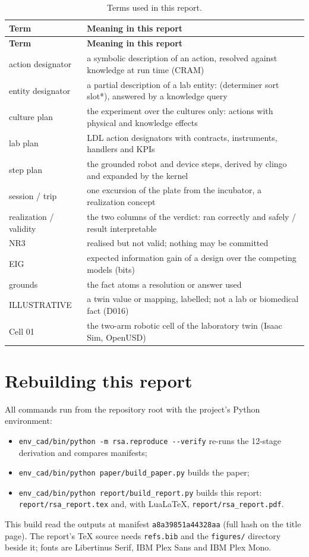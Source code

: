 \documentclass[10pt,a4paper]{article}
\begin{document}
{\small
\begin{xltabular}{\linewidth}{p{3.4cm}X}
\caption{Terms used in this report.}\label{tab:glossary}\\
\toprule
\textbf{Term} & \textbf{Meaning in this report} \\\midrule
\endfirsthead
\toprule
\textbf{Term} & \textbf{Meaning in this report} \\\midrule
\endhead
\bottomrule
\endlastfoot
action designator & a symbolic description of an action, resolved against knowledge at run time (CRAM) \\
entity designator & a partial description of a lab entity: (determiner sort slot*), answered by a knowledge query \\
culture plan & the experiment over the cultures only: actions with physical and knowledge effects \\
lab plan & LDL action designators with contracts, instruments, handlers and KPIs \\
step plan & the grounded robot and device steps, derived by clingo and expanded by the kernel \\
session / trip & one excursion of the plate from the incubator, a realization concept \\
realization / validity & the two columns of the verdict: ran correctly and safely / result interpretable \\
NR3 & realised but not valid; nothing may be committed \\
EIG & expected information gain of a design over the competing models (bits) \\
grounds & the fact atoms a resolution or answer used \\
ILLUSTRATIVE & a twin value or mapping, labelled; not a lab or biomedical fact (D016) \\
Cell 01 & the two-arm robotic cell of the laboratory twin (Isaac Sim, OpenUSD) \\
\end{xltabular}}

\section{Rebuilding this report}\label{sec:rebuild}

All commands run from the repository root with the project's Python environment:

\begin{itemize}
  \item \texttt{env\_\allowbreak{}cad/bin/python -\allowbreak{}m rsa.reproduce -\allowbreak{}-\allowbreak{}verify} re-runs the 12-stage derivation and compares manifests;
  \item \texttt{env\_\allowbreak{}cad/bin/python paper/build\_\allowbreak{}paper.py} builds the paper;
  \item \texttt{env\_\allowbreak{}cad/bin/python report/build\_\allowbreak{}report.py} builds this report: \texttt{report/rsa\_\allowbreak{}report.tex} and, with LuaLaTeX, \texttt{report/rsa\_\allowbreak{}report.pdf}.
\end{itemize}

This build read the outputs at manifest \texttt{a8a39851a44328aa} (full hash on the title page). The report's TeX source needs \texttt{refs.bib} and the \texttt{figures/} directory beside it; fonts are Libertinus Serif, IBM Plex Sans and IBM Plex Mono.
\end{document}
